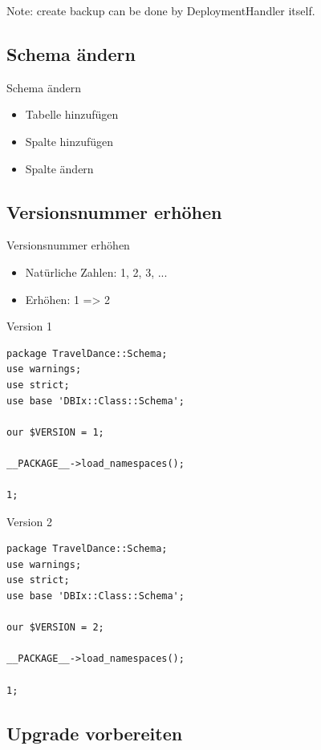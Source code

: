 Note: create backup can be done by DeploymentHandler itself.

\subsection{Schema ändern}

\begin{frame}{Schema ändern}
\begin{itemize}
\item Tabelle hinzufügen
\item Spalte hinzufügen
\item Spalte ändern
\end{itemize}
\end{frame}

\subsection{Versionsnummer erhöhen}
\begin{frame}{Versionsnummer erhöhen}
\begin{itemize}
\item Natürliche Zahlen: 1, 2, 3, ...
\item Erhöhen: 1 => 2
\end{itemize}
\end{frame}

\begin{frame}[fragile]{Version 1}
\begin{lstlisting}
package TravelDance::Schema;
use warnings;
use strict;
use base 'DBIx::Class::Schema';

our $VERSION = 1;

__PACKAGE__->load_namespaces();

1;
\end{lstlisting}
\end{frame}

\begin{frame}[fragile]{Version 2}
\begin{lstlisting}
package TravelDance::Schema;
use warnings;
use strict;
use base 'DBIx::Class::Schema';

our $VERSION = 2;

__PACKAGE__->load_namespaces();

1;
\end{lstlisting}
\end{frame}

\subsection{Upgrade vorbereiten}

